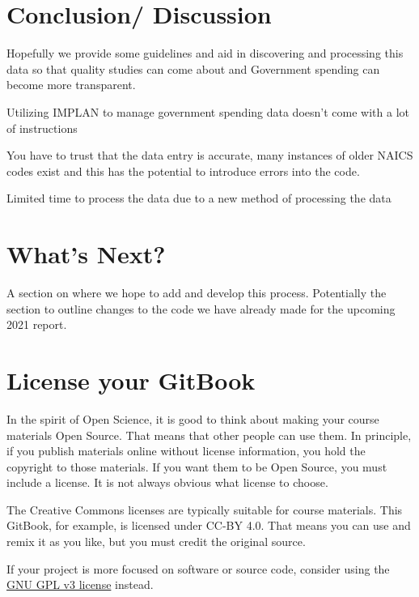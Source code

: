 \documentclass[
]{book}
\begin{document}
\hypertarget{conclusion-discussion}{%
\chapter{Conclusion/ Discussion}\label{conclusion-discussion}}

Hopefully we provide some guidelines and aid in discovering and processing this data so that quality studies can come about and
Government spending can become more transparent.

Utilizing IMPLAN to manage government spending data doesn't come with a lot of instructions

You have to trust that the data entry is accurate, many instances of older NAICS codes exist and this has the potential to introduce errors into the code.

Limited time to process the data due to a new method of processing the data

\hypertarget{whats-next}{%
\chapter{What's Next?}\label{whats-next}}

A section on where we hope to add and develop this process. Potentially the section to outline changes to the code we have already made for the upcoming 2021 report.

\hypertarget{license-your-gitbook}{%
\chapter{License your GitBook}\label{license-your-gitbook}}

In the spirit of Open Science, it is good to think about making your course materials Open Source. That means that other people can use them. In principle, if you publish materials online without license information, you hold the copyright to those materials. If you want them to be Open Source, you must include a license. It is not always obvious what license to choose.

The Creative Commons licenses are typically suitable for course materials. This GitBook, for example, is licensed under CC-BY 4.0. That means you can use and remix it as you like, but you must credit the original source.

If your project is more focused on software or source code, consider using the \href{https://www.gnu.org/licenses/gpl-3.0.en.html}{GNU GPL v3 license} instead.
\end{document}
